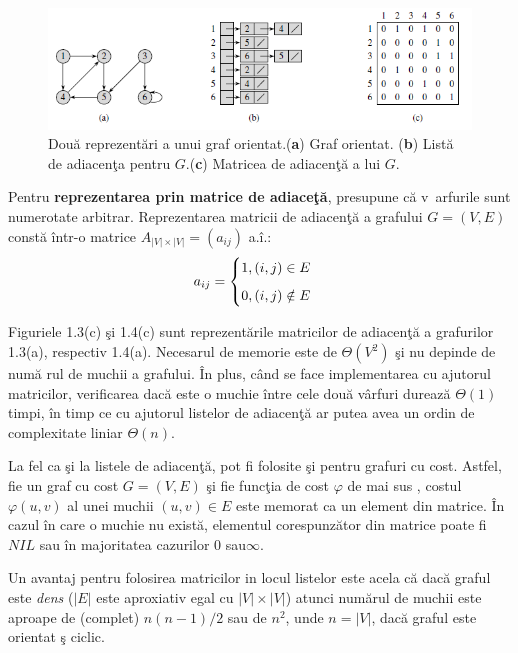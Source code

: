 \documentclass[11pt,a4paper]{report}
\begin{document}
    \begin{figure}[!hbt]
	\centering
	\includegraphics[width=13.2cm]{Figura5.png}
	\caption{Dou\u a reprezent\u ari a unui graf orientat.(\textbf{a}) Graf orientat. \centering \newline(\textbf{b}) List\u a de adiacen\c ta pentru $G$.(\textbf{c}) Matricea de adiacen\c t\u a a lui $G$.}
    \end{figure}
    
    
    Pentru \textbf{reprezentarea prin matrice de adiace\c t\u a}, presupune c\u a v\ arfurile sunt numerotate arbitrar. Reprezentarea matricii de adiacen\c t\u a a grafului $G=(V,E)$ const\u a \^ intr-o matrice $A_{|V|\times |V|}=(a_{ij})$ a.\^ i.:
    \begin{equation*}
    a_{ij}=\begin{cases}
    1, (i,j)\in E \medskip \\
    0, (i,j)\notin E
    \end{cases}
    \end{equation*}
    
    Figuriele 1.3(c) \c si 1.4(c) sunt reprezent\u arile matricilor de adiacen\c t\u a a grafurilor 1.3(a), respectiv 1.4(a). Necesarul de memorie este de $\Theta(V^2)$ \c si nu depinde de num\u a rul de muchii a grafului. \^ In plus, c\^ and se face implementarea cu ajutorul matricilor, verificarea dac\u a este o muchie \^ intre cele dou\u a v\^ arfuri dureaz\u a $\Theta(1)$ timpi, \^ in timp ce cu ajutorul listelor de adiacen\c t\u a ar putea avea un ordin de complexitate liniar $\Theta(n)$.
    
    La fel ca \c si la listele de adiacen\c t\u a, pot fi folosite \c si pentru grafuri cu cost. Astfel, fie un graf cu cost $G=(V,E)$ \c si fie func\c tia de cost $\varphi$ de mai sus , costul $\varphi(u,v)$ al unei muchii $(u,v)\in E$ este memorat ca un element din matrice. \^ In cazul \^ in care o muchie nu exist\u a, elementul corespunz\u ator din matrice poate fi $NIL$ sau \^ in majoritatea cazurilor $0$ sau$\infty$.
    
    Un avantaj pentru folosirea matricilor in locul listelor este acela c\u a dac\u a graful este \textit{dens} ($|E|$ este aproxiativ egal cu  $|V|\times |V|$) atunci num\u arul de muchii este aproape de (complet) $n(n-1)/2$ sau de $n^2$, unde $n=|V|$, dac\u a graful este orientat \c s ciclic.
\end{document}
